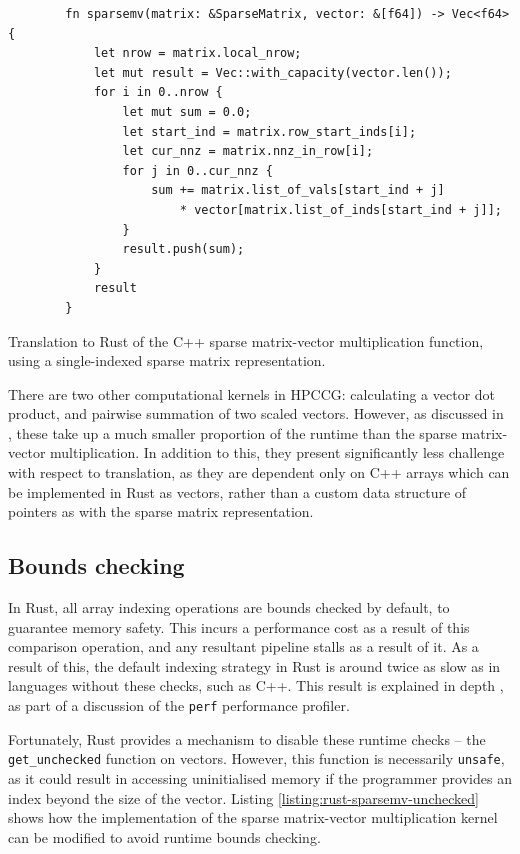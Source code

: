 \begin{code}
    \begin{verbatim}
        fn sparsemv(matrix: &SparseMatrix, vector: &[f64]) -> Vec<f64> {
            let nrow = matrix.local_nrow;
            let mut result = Vec::with_capacity(vector.len());
            for i in 0..nrow {
                let mut sum = 0.0;
                let start_ind = matrix.row_start_inds[i];
                let cur_nnz = matrix.nnz_in_row[i];
                for j in 0..cur_nnz {
                    sum += matrix.list_of_vals[start_ind + j]
                        * vector[matrix.list_of_inds[start_ind + j]];
                }
                result.push(sum);
            }
            result
        }
    \end{verbatim}
    \caption{Translation to Rust of the C++ sparse matrix-vector multiplication function, using a single-indexed sparse matrix representation.}
    \label{listing:rust-sparsemv-indexed}
\end{code}

There are two other computational kernels in HPCCG: calculating a vector dot product, and pairwise summation of two scaled vectors. However, as discussed in , these take up a much smaller proportion of the runtime than the sparse matrix-vector multiplication. In addition to this, they present significantly less challenge with respect to translation, as they are dependent only on C++ arrays which can be implemented in Rust as vectors, rather than a custom data structure of pointers as with the sparse matrix representation.

\subsection{Bounds checking}
\label{sec:translation-bounds-checking}

In Rust, all array indexing operations are bounds checked by default, to guarantee memory safety. This incurs a performance cost as a result of this comparison operation, and any resultant pipeline stalls as a result of it. As a result of this, the default indexing strategy in Rust is around twice as slow as in languages without these checks, such as C++. This result is explained in depth , as part of a discussion of the \texttt{perf} performance profiler.

Fortunately, Rust provides a mechanism to disable these runtime checks -- the \texttt{get_unchecked} function on vectors. However, this function is necessarily \texttt{unsafe}, as it could result in accessing uninitialised memory if the programmer provides an index beyond the size of the vector. Listing \ref{listing:rust-sparsemv-unchecked} shows how the implementation of the sparse matrix-vector multiplication kernel can be modified to avoid runtime bounds checking.

